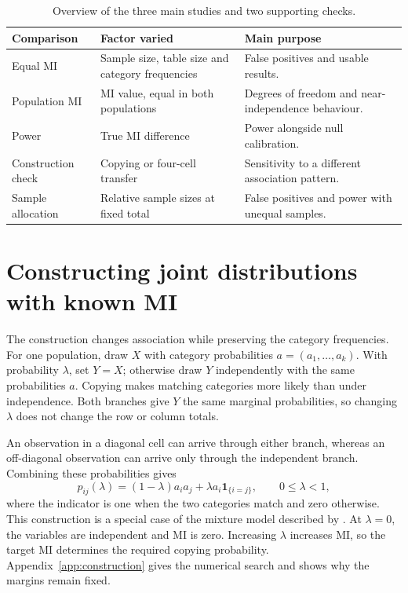 \begin{table}[H]
\centering
\caption{Overview of the three main studies and two supporting checks.}
\label{tab:design-families}
\begin{tabularx}{\textwidth}{@{}l>{\raggedright\arraybackslash}X>{\raggedright\arraybackslash}X@{}}
\toprule
Comparison & Factor varied & Main purpose\\
\midrule
Equal MI & Sample size, table size and category frequencies & False positives and usable results.\\
Population MI & MI value, equal in both populations & Degrees of freedom and near-independence behaviour.\\
Power & True MI difference & Power alongside null calibration.\\
\midrule
Construction check & Copying or four-cell transfer & Sensitivity to a different association pattern.\\
Sample allocation & Relative sample sizes at fixed total & False positives and power with unequal samples.\\
\bottomrule
\end{tabularx}
\end{table}

\section{Constructing joint distributions with known MI}

The construction changes association while preserving the category
frequencies. For one population, draw \(X\) with category probabilities
\(a=(a_1,\ldots,a_k)\). With probability \(\lambda\), set \(Y=X\);
otherwise draw \(Y\) independently with the same probabilities \(a\).
Copying makes matching categories more likely than under independence.
Both branches give \(Y\) the same marginal probabilities, so changing
\(\lambda\) does not change the row or column totals.

An observation in a diagonal cell can arrive through either branch,
whereas an off-diagonal observation can arrive only through the
independent branch.
Combining these probabilities gives
\begin{equation}
 p_{ij}(\lambda)=(1-\lambda)a_i a_j
                  +\lambda a_i\mathbf{1}_{\{i=j\}},
 \qquad 0\leq\lambda<1,
 \label{eq:copying-construction}
\end{equation}
where the indicator is one when the two categories match and zero otherwise.
This construction is a special case of the mixture model described by
\citet{bocci2010}.
At \(\lambda=0\), the variables are independent and MI is zero.
Increasing \(\lambda\) increases MI, so the target MI determines the required
copying probability. Appendix~\ref{app:construction} gives the numerical
search and shows why the margins remain fixed.

